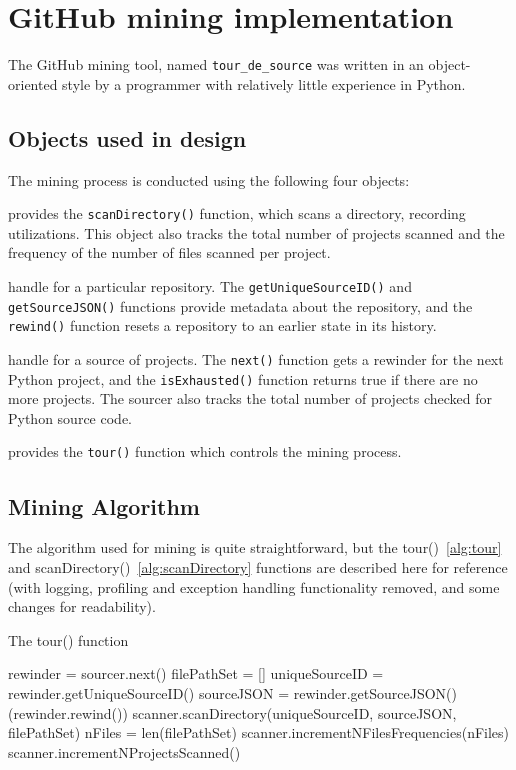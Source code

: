 \section{GitHub mining implementation}
\label{sec:miningImplementation}

The GitHub mining tool, named {\tt tour\_de\_source} was written in an object-oriented style by a programmer with relatively little experience in Python.

\subsection{Objects used in design}
The mining process is conducted using the following four objects:
\begin{description} \itemsep -1pt
\item[Scanner] provides the {\tt scanDirectory()} function, which scans a directory, recording utilizations.  This object also tracks the total number of projects scanned and the frequency of the number of files scanned per project.
\item[Rewinder] handle for a particular repository. The {\tt getUniqueSourceID()} and {\tt getSourceJSON()} functions provide metadata about the repository, and the {\tt rewind()} function resets a repository to an earlier state in its history.
\item[Sourcer] handle for a source of projects.  The {\tt next()} function gets a rewinder for the next Python project, and the {\tt isExhausted()} function returns true if there are no more projects.  The sourcer also tracks the total number of projects checked for Python source code.
\item[Tourist] provides the {\tt tour()} function which controls the mining process.
\end{description}

\subsection{Mining Algorithm}
The algorithm used for mining is quite straightforward, but the tour()~\ref{alg:tour} and scanDirectory()~\ref{alg:scanDirectory} functions are described here for reference (with logging, profiling and exception handling functionality removed, and some changes for readability).

\begin{algorithm}
  \caption{The tour() function}\label{alg:tour}
  \begin{algorithmic}[1]
 \label{line:isExhausted}
    \State rewinder = sourcer.next() \label{line:next}
    \State filePathSet = []
    \State uniqueSourceID = rewinder.getUniqueSourceID()
    \State sourceJSON = rewinder.getSourceJSON()
    \While (rewinder.rewind()) \label{line:rewind}
        \State scanner.scanDirectory(uniqueSourceID, sourceJSON, filePathSet)\label{line:scanDirectory}
    \EndWhile
    \State nFiles = len(filePathSet)
    \State scanner.incrementNFilesFrequencies(nFiles)\label{line:fileFrequencies}
    \State scanner.incrementNProjectsScanned()\label{line:projectScannedCount}
\EndWhile
\end{algorithmic}
\end{algorithm}

